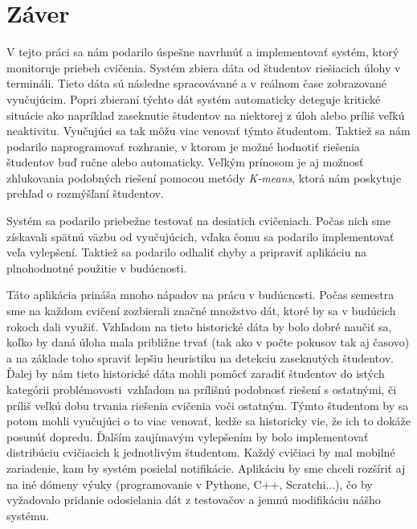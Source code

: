 \chapter*{Záver}  %

V tejto práci sa nám podarilo úspešne navrhnúť a implementovať systém, ktorý monitoruje
priebeh cvičenia. Systém zbiera dáta od študentov riešiacich úlohy v termináli.
Tieto dáta sú následne spracovávané a v reálnom čase zobrazované vyučujúcim.
Popri zbieraní týchto dát systém automaticky deteguje kritické situácie ako napríklad
zaseknutie študentov na niektorej z úloh alebo príliš veľkú neaktivitu. Vyučujúci
sa tak môžu viac venovať týmto študentom. Taktiež sa nám podarilo naprogramovať
rozhranie, v ktorom je možné hodnotiť riešenia študentov buď ručne alebo automaticky.
Veľkým prínosom je aj možnosť zhlukovania podobných riešení pomocou metódy
\textit{K-means}, ktorá nám poskytuje prehľad o rozmýšľaní študentov.

Systém sa podarilo priebežne testovať na desiatich cvičeniach.
Počas nich sme získavali spätnú
väzbu od vyučujúcich, vďaka čomu sa podarilo implementovať veľa vylepšení.
Taktiež sa podarilo odhaliť
chyby a pripraviť aplikáciu na plnohodnotné použitie v budúcnosti.

Táto aplikácia prináša mnoho nápadov na prácu v budúcnosti. Počas semestra
sme na každom cvičení zozbierali značné množstvo dát, ktoré by sa v budúcich rokoch
dali využiť.
Vzhľadom na tieto historické dáta by bolo dobré naučiť sa, koľko by daná úloha mala
približne trvať (tak ako v počte pokusov tak aj časovo) a na základe toho spraviť lepšiu
heuristiku na detekciu zaseknutých študentov.
Ďalej by nám tieto historické dáta mohli pomôcť zaradiť študentov do istých
\glqq kategórii problémovosti\grqq~vzhľadom na prílišnú podobnosť riešení s ostatnými,
či príliš veľkú dobu trvania riešenia cvičenia voči ostatným. Týmto študentom by sa
potom mohli vyučujúci o to viac venovať, kedže sa historicky vie, že ich to dokáže
posunúť dopredu. Ďalším zaujímavým vylepšením by bolo implementovať distribúciu cvičiacich
k jednotlivým
študentom. Každý cvičiaci by mal mobilné zariadenie, kam by systém posielal
notifikácie. Aplikáciu by sme chceli rozšíriť aj na iné dómeny výuky
(programovanie v Pythone, C++, Scratchi...), čo by vyžadovalo pridanie odosielania
dát z testovačov a jemnú modifikáciu nášho systému.





